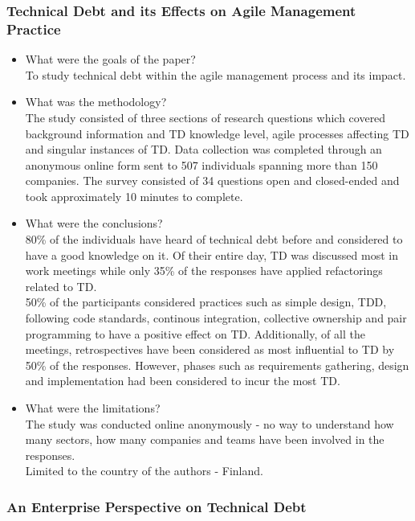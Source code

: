 \documentclass{mprop}
\begin{document}
\subsubsection{Technical Debt and its Effects on Agile Management Practice}
\cite{Holvitie2014}
\begin{itemize}
	\item What were the goals of the paper? \\
	      To study technical debt within the agile management process and its
	      impact.
	\item What was the methodology? \\
	      The study consisted of three sections of research questions which
	      covered background information and TD knowledge level, agile
	      processes affecting TD and singular instances of TD. Data collection
	      was completed through an anonymous online form sent to 507
	      individuals spanning more than 150 companies. The survey consisted
	      of 34 questions open and closed-ended and took approximately 10
	      minutes to complete.
	\item What were the conclusions? \\
	      80\% of the individuals have heard of technical debt before and
	      considered to have a good knowledge on it. Of their entire day, TD
	      was discussed most in work meetings while only 35\% of the responses
	      have applied refactorings related to TD.\\
	      50\% of the participants considered practices such as simple design,
	      TDD, following code standards, continous integration, collective
	      ownership and pair programming to have a positive effect on TD.
	      Additionally, of all the meetings, retrospectives have been
	      considered as most influential to TD by 50\% of the responses.
	      However, phases such as requirements gathering, design and
	      implementation had been considered to incur the most TD.
	\item What were the limitations? \\
	      The study was conducted online anonymously - no way to understand
	      how many sectors, how many companies and teams have been involved in
	      the responses.\\
	      Limited to the country of the authors - Finland.
\end{itemize}

\subsubsection{An Enterprise Perspective on Technical Debt} \cite{Klinger2011}
\end{document}
